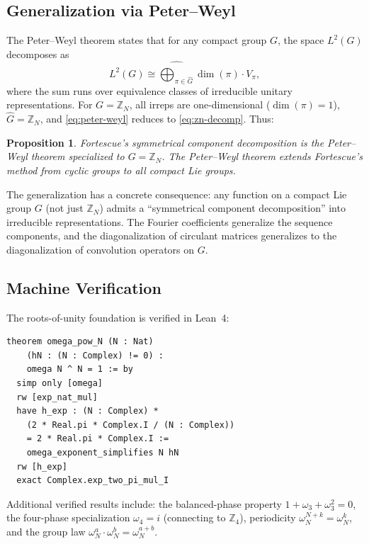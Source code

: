 \documentclass[11pt]{article}
\newtheorem{proposition}[theorem]{Proposition}
\newcommand{\ZZ}{\mathbb{Z}}
\begin{document}
\subsection{Generalization via Peter--Weyl}

The Peter--Weyl theorem \cite{peter-weyl1927} states that for any
compact group $G$, the space $L^2(G)$ decomposes as
\begin{equation}\label{eq:peter-weyl}
  L^2(G) \cong \widehat{\bigoplus_{\pi \in \hat{G}}}
    \dim(\pi) \cdot V_\pi,
\end{equation}
where the sum runs over equivalence classes of irreducible unitary
representations. For $G = \ZZ_N$, all irreps are one-dimensional
($\dim(\pi) = 1$), $\hat{G} = \ZZ_N$, and
\eqref{eq:peter-weyl} reduces to \eqref{eq:zn-decomp}. Thus:

\begin{proposition}\label{prop:peter-weyl-fortescue}
Fortescue's symmetrical component decomposition is the Peter--Weyl
theorem specialized to $G = \ZZ_N$. The Peter--Weyl theorem extends
Fortescue's method from cyclic groups to all compact Lie groups.
\end{proposition}

The generalization has a concrete consequence:
any function on a compact Lie group $G$ (not just $\ZZ_N$) admits a
``symmetrical component decomposition'' into irreducible
representations. The Fourier coefficients generalize the sequence
components, and the diagonalization of circulant matrices generalizes
to the diagonalization of convolution operators on $G$.

\subsection{Machine Verification}

The roots-of-unity foundation is verified in Lean~4:

\begin{lstlisting}[caption={$\omega_N^N = 1$: the central theorem of Fortescue's decomposition (excerpt from \texttt{polyphase\_formula.lean}).}]
theorem omega_pow_N (N : Nat)
    (hN : (N : Complex) != 0) :
    omega N ^ N = 1 := by
  simp only [omega]
  rw [exp_nat_mul]
  have h_exp : (N : Complex) *
    (2 * Real.pi * Complex.I / (N : Complex))
    = 2 * Real.pi * Complex.I :=
    omega_exponent_simplifies N hN
  rw [h_exp]
  exact Complex.exp_two_pi_mul_I
\end{lstlisting}

Additional verified results include: the balanced-phase property
$1 + \omega_3 + \omega_3^2 = 0$, the four-phase specialization
$\omega_4 = i$ (connecting to $\ZZ_4$), periodicity
$\omega_N^{N+k} = \omega_N^k$, and the group law
$\omega_N^a \cdot \omega_N^b = \omega_N^{a+b}$.
\end{document}
